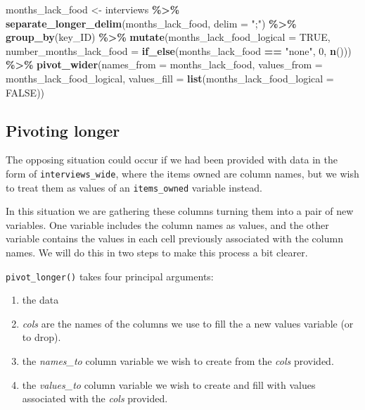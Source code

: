 \documentclass[
]{article}
\newenvironment{Shaded}{\begin{snugshade}}{\end{snugshade}}
\newcommand{\AttributeTok}[1]{\textcolor[rgb]{0.13,0.29,0.53}{#1}}
\newcommand{\ConstantTok}[1]{\textcolor[rgb]{0.56,0.35,0.01}{#1}}
\newcommand{\DecValTok}[1]{\textcolor[rgb]{0.00,0.00,0.81}{#1}}
\newcommand{\FunctionTok}[1]{\textcolor[rgb]{0.13,0.29,0.53}{\textbf{#1}}}
\newcommand{\NormalTok}[1]{#1}
\newcommand{\OtherTok}[1]{\textcolor[rgb]{0.56,0.35,0.01}{#1}}
\newcommand{\SpecialCharTok}[1]{\textcolor[rgb]{0.81,0.36,0.00}{\textbf{#1}}}
\newcommand{\StringTok}[1]{\textcolor[rgb]{0.31,0.60,0.02}{#1}}
\providecommand{\tightlist}{%
  \setlength{\itemsep}{0pt}\setlength{\parskip}{0pt}}
\begin{document}
\begin{Shaded}
\begin{Highlighting}[]
\NormalTok{months\_lack\_food }\OtherTok{\textless{}{-}}\NormalTok{ interviews }\SpecialCharTok{\%\textgreater{}\%}
  \FunctionTok{separate\_longer\_delim}\NormalTok{(months\_lack\_food, }\AttributeTok{delim =} \StringTok{";"}\NormalTok{) }\SpecialCharTok{\%\textgreater{}\%}
  \FunctionTok{group\_by}\NormalTok{(key\_ID) }\SpecialCharTok{\%\textgreater{}\%}
  \FunctionTok{mutate}\NormalTok{(}\AttributeTok{months\_lack\_food\_logical =} \ConstantTok{TRUE}\NormalTok{,}
         \AttributeTok{number\_months\_lack\_food =} \FunctionTok{if\_else}\NormalTok{(months\_lack\_food }\SpecialCharTok{==} \StringTok{"none"}\NormalTok{, }\DecValTok{0}\NormalTok{, }\FunctionTok{n}\NormalTok{())) }\SpecialCharTok{\%\textgreater{}\%}
  \FunctionTok{pivot\_wider}\NormalTok{(}\AttributeTok{names\_from =}\NormalTok{ months\_lack\_food,}
              \AttributeTok{values\_from =}\NormalTok{ months\_lack\_food\_logical,}
              \AttributeTok{values\_fill =} \FunctionTok{list}\NormalTok{(}\AttributeTok{months\_lack\_food\_logical =} \ConstantTok{FALSE}\NormalTok{))}
\end{Highlighting}
\end{Shaded}

\subsection{Pivoting longer}\label{pivoting-longer}

The opposing situation could occur if we had been provided with data in
the form of \texttt{interviews\_wide}, where the items owned are column
names, but we wish to treat them as values of an \texttt{items\_owned}
variable instead.

In this situation we are gathering these columns turning them into a
pair of new variables. One variable includes the column names as values,
and the other variable contains the values in each cell previously
associated with the column names. We will do this in two steps to make
this process a bit clearer.

\texttt{pivot\_longer()} takes four principal arguments:

\begin{enumerate}
\def\labelenumi{\arabic{enumi}.}
\tightlist
\item
  the data
\item
  \emph{cols} are the names of the columns we use to fill the a new
  values variable (or to drop).
\item
  the \emph{names\_to} column variable we wish to create from the
  \emph{cols} provided.
\item
  the \emph{values\_to} column variable we wish to create and fill with
  values associated with the \emph{cols} provided.
\end{enumerate}
\end{document}
